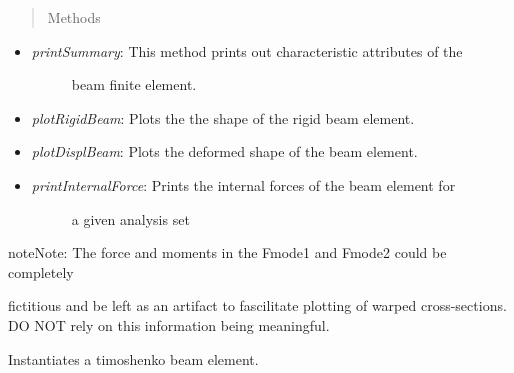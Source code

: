 \documentclass[letterpaper,10pt,english]{sphinxmanual}
\begin{document}
\begin{fulllineitems}
\begin{itemize}
\end{itemize}
\begin{quote}\begin{description}
\item[{Methods}] \leavevmode
\end{description}\end{quote}
\begin{itemize}
\item {} \begin{description}
\item[{\emph{printSummary}: This method prints out characteristic attributes of the}] \leavevmode
beam finite element.

\end{description}

\item {} 
\emph{plotRigidBeam}: Plots the the shape of the rigid beam element.

\item {} 
\emph{plotDisplBeam}: Plots the deformed shape of the beam element.

\item {} \begin{description}
\item[{\emph{printInternalForce}: Prints the internal forces of the beam element for}] \leavevmode
a given analysis set

\end{description}

\end{itemize}

\begin{notice}{note}{Note:}
The force and moments in the Fmode1 and Fmode2 could be completely
\end{notice}

fictitious and be left as an artifact to fascilitate plotting of warped
cross-sections. DO NOT rely on this information being meaningful.

\begin{fulllineitems}
\label{structures:AeroComBAT.Structures.TBeam.__init__}
Instantiates a timoshenko beam element.


\end{fulllineitems}
\end{fulllineitems}
\end{document}

